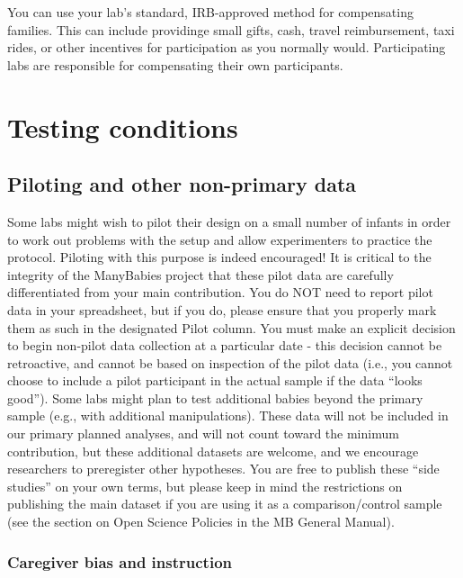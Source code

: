 \documentclass[
  letterpaper,
  DIV=11,
  numbers=noendperiod,
  oneside]{scrreprt}
\begin{document}
You can use your lab's standard, IRB-approved method for compensating
families. This can include providinge small gifts, cash, travel
reimbursement, taxi rides, or other incentives for participation as you
normally would. Participating labs are responsible for compensating
their own participants.

\chapter{Testing conditions}\label{sec-conditions}

\section{Piloting and other non-primary
data}\label{piloting-and-other-non-primary-data}

Some labs might wish to pilot their design on a small number of infants
in order to work out problems with the setup and allow experimenters to
practice the protocol. Piloting with this purpose is indeed encouraged!
It is critical to the integrity of the ManyBabies project that these
pilot data are carefully differentiated from your main contribution. You
do NOT need to report pilot data in your spreadsheet, but if you do,
please ensure that you properly mark them as such in the designated
Pilot column. You must make an explicit decision to begin non-pilot data
collection at a particular date - this decision cannot be retroactive,
and cannot be based on inspection of the pilot data (i.e., you cannot
choose to include a pilot participant in the actual sample if the data
``looks good''). Some labs might plan to test additional babies beyond
the primary sample (e.g., with additional manipulations). These data
will not be included in our primary planned analyses, and will not count
toward the minimum contribution, but these additional datasets are
welcome, and we encourage researchers to preregister other hypotheses.
You are free to publish these ``side studies'' on your own terms, but
please keep in mind the restrictions on publishing the main dataset if
you are using it as a comparison/control sample (see the section on Open
Science Policies in the MB General Manual).

\subsection{Caregiver bias and
instruction}\label{caregiver-bias-and-instruction}
\end{document}
